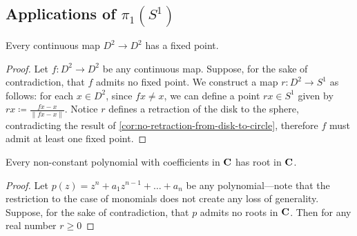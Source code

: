 \subsection{Applications of \texorpdfstring{\(\pi_1(S^1)\)}{pi1(S1)}}

\begin{theorem}
    \label{thm:brouwer-fixed-point}
    Every continuous map \(D^2 \to D^2\) has a fixed point.
\end{theorem}

\begin{proof}
    Let \(f: D^2 \to D^2\) be any continuous map. Suppose, for the sake of
    contradiction, that \(f\) admits no fixed point. We construct a map
    \(r: D^2 \to S^1\) as follows: for each \(x \in D^2\), since \(f x \neq x\), we
    can define a point \(r x \in S^1\) given by
    \(r x \coloneq \frac{f x - x}{\| fx - x \|}\). Notice \(r\) defines a retraction
    of the disk to the sphere, contradicting the result of
    \cref{cor:no-retraction-from-disk-to-circle}, therefore \(f\) must admit at
    least one fixed point.
\end{proof}

\begin{theorem}
    \label{thm:fundamental-theorem-of-algebra-pi1-S1}
    Every non-constant polynomial with coefficients in \(\mathbf{C}\) has root in \(\mathbf{C}\).
\end{theorem}

\begin{proof}
    Let \(p(z) = z^n + a_1 z^{n-1} + \dots + a_n\) be any polynomial---note that the
    restriction to the case of monomials does not create any loss of
    generality. Suppose, for the sake of contradiction, that \(p\) admits no roots
    in \(\mathbf{C}\). Then for any real number \(r \geq 0\)
\end{proof}
